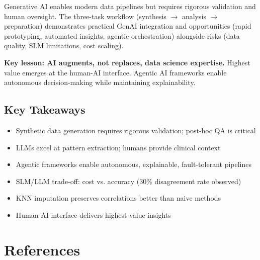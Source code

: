 \documentclass[10pt,a4paper]{article}
\begin{document}
Generative AI enables modern data pipelines but requires rigorous validation and human oversight. The three-task workflow (synthesis $\to$ analysis $\to$ preparation) demonstrates practical GenAI integration and opportunities (rapid prototyping, automated insights, agentic orchestration) alongside risks (data quality, SLM limitations, cost scaling).

\textbf{Key lesson: AI augments, not replaces, data science expertise.} Highest value emerges at the human-AI interface. Agentic AI frameworks enable autonomous decision-making while maintaining explainability.

\subsection{Key Takeaways}
\begin{itemize}[nosep]
    \item Synthetic data generation requires rigorous validation; post-hoc QA is critical
    \item LLMs excel at pattern extraction; humans provide clinical context
    \item Agentic frameworks enable autonomous, explainable, fault-tolerant pipelines
    \item SLM/LLM trade-off: cost vs. accuracy (30\% disagreement rate observed)
    \item KNN imputation preserves correlations better than naive methods
    \item Human-AI interface delivers highest-value insights
\end{itemize}
\section*{References}
\end{document}

